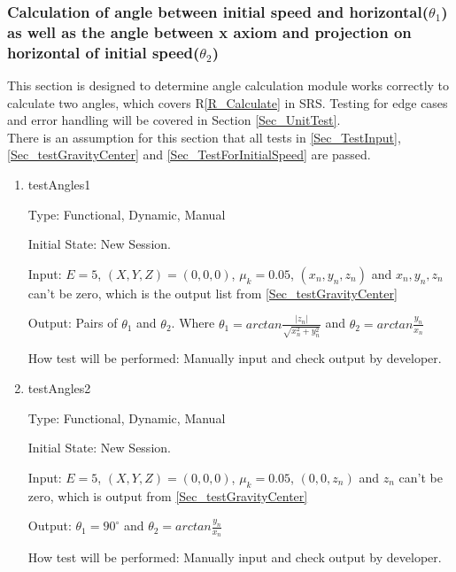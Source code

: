 \documentclass[12pt, titlepage]{article}
\newcommand{\rref}[1]{R\ref{#1}}
\begin{document}
\subsubsection{Calculation of angle between initial speed and horizontal($\theta _{1}$) as well as the angle between x axiom and projection on horizontal of initial speed($\theta _{2}$)}
\label{Sec_TestForAngle}

This section is designed to determine  angle calculation module works correctly to calculate two angles, which covers \rref{R_Calculate} in SRS. Testing for edge cases and error handling will be covered in Section \ref{Sec_UnitTest}.\\
There is an assumption for this section that all tests in \ref{Sec_TestInput}, \ref{Sec_testGravityCenter} and \ref{Sec_TestForInitialSpeed} are passed.
\begin{enumerate}

\item{testAngles1\\}

Type: Functional, Dynamic, Manual

Initial State: New Session.

Input: $E = 5$, $(X,Y,Z) = (0,0,0)$, $\mu_{k} = 0.05$, $(x_{n},y_{n},z_{n})$ and $x_{n},y_{n},z_{n}$ can't be zero, which is the output list from \ref{Sec_testGravityCenter}  

Output: Pairs of $\theta_{1}$ and $\theta_{2}$. Where $\theta_{1}=arctan \frac{|z_{n}|}{\sqrt{x_{n}^2+y_{n}^2}}$ and $\theta_{2}=arctan \frac{y_{n}}{x_{n}}$

How test will be performed: Manually input and check output by developer. 

\item{testAngles2\\}

Type: Functional, Dynamic, Manual

Initial State: New Session.

Input: $E = 5$, $(X,Y,Z) = (0,0,0)$, $\mu_{k} = 0.05$, $(0,0,z_{n})$ and $z_{n}$ can't be zero, which is output from \ref{Sec_testGravityCenter}  

Output: $\theta_{1}=90^{\circ}$ and $\theta_{2}=arctan \frac{y_{n}}{x_{n}}$

How test will be performed: Manually input and check output by developer.


\end{enumerate}
\end{document}
